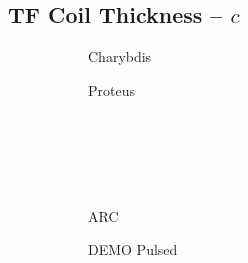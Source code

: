 \clearpage

\newpage

\subsection*{ TF Coil Thickness -- $c$ }
  \label{subsection:scan_c}

\begin{figure*}[h!]
    \centering
    \hfill
    \begin{subfigure}[t]{0.45\textwidth}
        \centering
    \begin{adjustbox}{width=\textwidth}
      \Large
      
    \end{adjustbox}
        \caption{Charybdis}
    \end{subfigure}
    \hfill
    \begin{subfigure}[t]{0.45\textwidth}
        \centering
    \begin{adjustbox}{width=\textwidth}
      \Large
      
    \end{adjustbox}
        \caption{Proteus}
    \end{subfigure}
    \hfill \hfill ~\\ ~\\ ~\\ ~\\
    \hfill
    \begin{subfigure}[t]{0.45\textwidth}
        \centering
    \begin{adjustbox}{width=\textwidth}
      \Large
      
    \end{adjustbox}
        \caption{ARC}
    \end{subfigure}
    \hfill
    \begin{subfigure}[t]{0.45\textwidth}
        \centering
    \begin{adjustbox}{width=\textwidth}
      \Large
      
    \end{adjustbox}
        \caption{DEMO Pulsed}
    \end{subfigure}
    \hfill \hfill ~\\ ~\\ ~\\ ~\\
    \hfill
    \begin{subfigure}[t]{0.45\textwidth}
        \centering
    \begin{adjustbox}{width=\textwidth}

\end{adjustbox}
\end{subfigure}
\end{figure*}
